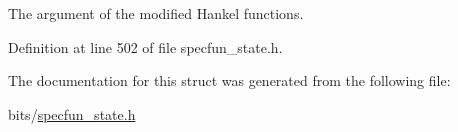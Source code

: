The argument of the modified Hankel functions. 



Definition at line 502 of file specfun\+\_\+state.\+h.



The documentation for this struct was generated from the following file\+:\begin{DoxyCompactItemize}
\item 
bits/\hyperlink{specfun__state_8h}{specfun\+\_\+state.\+h}\end{DoxyCompactItemize}
